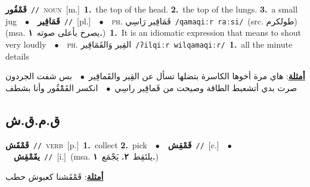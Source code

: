 \documentclass[10pt,a4paper,twoside]{article} %
\begin{document}
\begin{multicols}{2}
{\setlength\topsep{0pt}\textbf{\foreignlanguage{arabic}{قَمْقُور}}\ {\color{gray}\texttt{//}\color{black}}\ \textsc{noun}\ [m.]\ \textbf{1.}~the top of the head.  \textbf{2.}~the top of the lungs.  \textbf{3.}~a small jug\ \ $\bullet$\ \ \setlength\topsep{0pt}\textbf{\foreignlanguage{arabic}{قَمَاقِير}}\ {\color{gray}\texttt{//}\color{black}}\ [pl.]\ \ $\bullet$\ \ \textsc{ph.} \color{gray} \foreignlanguage{arabic}{قَمَاقِير رَاسِي}\color{black}\ {\color{gray}\texttt{/{\sffamily qamaqiːr raːsi}/}\color{black}}\ \color{gray}(src. \foreignlanguage{arabic}{طولكرم})\color{black}\ \color{gray} (msa. \foreignlanguage{arabic}{يصرخ بأعلى صوته}~\foreignlanguage{arabic}{\textbf{١.}})\color{black}\ \textbf{1.}~It is an idiomatic expression that means to shout very loudly\ \ $\bullet$\ \ \textsc{ph.} \color{gray} \foreignlanguage{arabic}{القِير وَالقَمَاقِير}\color{black}\ {\color{gray}\texttt{/{\sffamily ʔilqiːr wilqamaqiːr}/}\color{black}}\ \textbf{1.}~all the minute details\  \begin{flushright}\color{gray}\foreignlanguage{arabic}{\textbf{\underline{\foreignlanguage{arabic}{أمثلة}}}: هاي مرة أخوها الكاسرة بتضلها تسأل عن القِير والقَماقِير\ $\bullet$\ \  بس شفت الجردون صرت بدي أتشعبط الطاقة وصيحت من قَماقِير راسِي\ $\bullet$\ \  انكسر القَمْْقُور وأنا بشطف}\end{flushright}\color{black}} \vspace{2mm}

\vspace{-3mm}
\subsection*{\color{blue}\foreignlanguage{arabic}{ق.م.ق.ش}\color{blue}{}} 

{\setlength\topsep{0pt}\textbf{\foreignlanguage{arabic}{قَمْقَش}}\ {\color{gray}\texttt{//}\color{black}}\ \textsc{verb}\ [p.]\ \textbf{1.}~collect  \textbf{2.}~pick\ \ $\bullet$\ \ \setlength\topsep{0pt}\textbf{\foreignlanguage{arabic}{قَمْقِش}}\ {\color{gray}\texttt{//}\color{black}}\ [c.]\ \ $\bullet$\ \ \setlength\topsep{0pt}\textbf{\foreignlanguage{arabic}{يقَمْقِش}}\ {\color{gray}\texttt{//}\color{black}}\ [i.]\ \color{gray}(msa. \foreignlanguage{arabic}{يلتَقِط}~\foreignlanguage{arabic}{\textbf{٢.}}  \foreignlanguage{arabic}{يَجْمَع}~\foreignlanguage{arabic}{\textbf{١.}})\color{black}\  \begin{flushright}\color{gray}\foreignlanguage{arabic}{\textbf{\underline{\foreignlanguage{arabic}{أمثلة}}}: قَمْقَشنا كعبوش حطب}\end{flushright}\color{black}} \vspace{2mm}


\end{multicols}
\end{document}
